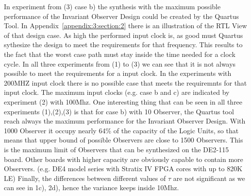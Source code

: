 In experiment from (3) case b) the synthesis with the maximum possible performance of the Invariant Observer Design could be created by the Quartus Tool.
In Appendix~\ref{appendix:3:section:2} there is an illustration of the RTL View of that design case.
As high the performed input clock is, as good must Quartus sythesize the design to meet the requirements for that frequency. This results to the fact
that the worst case path must stay inside the time needed for a clock cycle. In all three experiments from (1) to (3) we can see that it is not always possible
to meet the requirements for a input clock. In the experiments with 200MHZ input clock there is no possible case that meets the requiremnts for that input clock.
The maximum input clocks (e.g. case b and c) are indicated by experiment (2) with 100Mhz.  
One interesting thing that can be seen in all three experiments (1),(2),(3) is that for case b) with 10 Observer, the Quartus tool reach always the maximum performance
for the Invariant Observer Design.
With 1000 Observer it occupy nearly 64\% of the capacity of the Logic Units, so that means that upper bound of possible Observers are close to 1500 Observers.
This is the maximum limit of Observers that can be synthesized on the DE2-115 board. 
Other boards with higher capacity are obviously capable to contain more Observers. (e.g. DE4 model series with Stratix IV FPGA cores with up to 820K LE)
Finally, the differences between different values of $\tau$ are not significant as we can see in 1c), 2d), hence the variance keeps inside 10Mhz.

